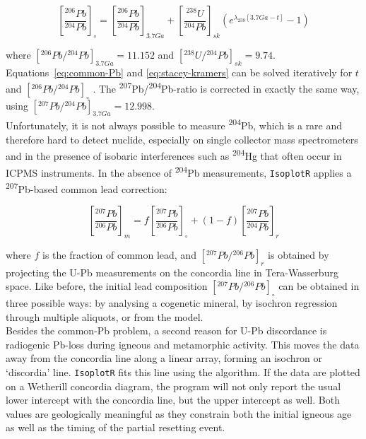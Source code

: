 \documentclass{article}
\begin{document}
\begin{equation}
  \left[\frac{{}^{206}Pb}{{}^{204}Pb}\right]_\circ =
  \left[\frac{{}^{206}Pb}{{}^{204}Pb}\right]_{3.7Ga} +
  \left[\frac{{}^{238}U}{{}^{204}Pb}\right]_{sk}
  \left(e^{\lambda_{238}[3.7Ga - t]}-1\right)
  \label{eq:stacey-kramers}
\end{equation}

\noindent where $\left[{}^{206}Pb/{}^{204}Pb\right]_{3.7Ga} =
11.152$ and $\left[{}^{238}U/{}^{204}Pb\right]_{sk} = 9.74$.
Equations~\ref{eq:common-Pb} and \ref{eq:stacey-kramers} can be solved
iteratively for $t$ and $\left[{}^{206}Pb/{}^{204}Pb\right]_\circ$
\citep{chew2014}. The
\textsuperscript{207}Pb/\textsuperscript{204}Pb-ratio is corrected in
exactly the same way, using
$\left[{}^{207}Pb/{}^{204}Pb\right]_{3.7Ga} = 12.998$.\\

Unfortunately, it is not always possible to measure
\textsuperscript{204}Pb, which is a rare and therefore hard to detect
nuclide, especially on single collector mass spectrometers and in the
presence of isobaric interferences such as \textsuperscript{204}Hg
that often occur in ICPMS instruments. In the absence of
\textsuperscript{204}Pb measurements, \texttt{IsoplotR} applies a
\textsuperscript{207}Pb-based common lead correction:

\begin{equation*}
  \left[\frac{{}^{207}Pb}{{}^{206}Pb}\right]_m =
  f \left[\frac{{}^{207}Pb}{{}^{206}Pb}\right]_\circ +
  (1-f) \left[\frac{{}^{207}Pb}{{}^{204}Pb}\right]_r
\end{equation*}

\noindent where $f$ is the fraction of common lead, and
$[{}^{207}Pb/{}^{206}Pb]_r$ is obtained by projecting the U-Pb
measurements on the concordia line in Tera-Wasserburg space.  Like
before, the initial lead composition $[{}^{207}Pb/{}^{206}Pb]_\circ$
can be obtained in three possible ways: by analysing a cogenetic
mineral, by isochron regression through multiple aliquots, or from the
\citet{stacey1975} model.\\

Besides the common-Pb problem, a second reason for U-Pb discordance is
radiogenic Pb-loss during igneous and metamorphic activity.  This
moves the data away from the concordia line along a linear array,
forming an isochron or `discordia' line.  \texttt{IsoplotR} fits this
line using the \citet{ludwig1998} algorithm. If the data are plotted
on a Wetherill concordia diagram, the program will not only report the
usual lower intercept with the concordia line, but the upper intercept
as well. Both values are geologically meaningful as they constrain
both the initial igneous age as well as the timing of the partial
resetting event.\\
\end{document}
